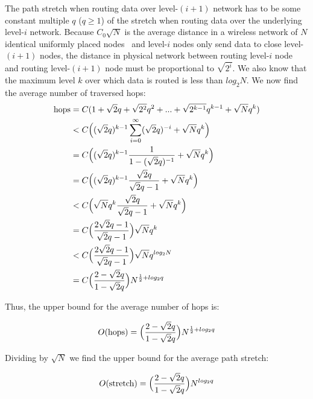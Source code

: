 \documentclass[conference]{IEEEtran}
\theoremstyle{definition}
\begin{document}
The path stretch when routing data over level-$(i+1)$ network has to be some constant multiple $q$ ($q \ge 1$) of the stretch when routing data over the underlying level-$i$ network. Because $C_0\sqrt{N}$ is the average distance in a wireless network of $N$ identical uniformly placed nodes~\cite{Kleinrock} and level-$i$ nodes only send data to close level-$(i+1)$ nodes, the distance in physical network between routing level-$i$ node and routing level-$(i+1)$ node must be proportional to $\sqrt{2^i}$. We also know that the maximum level $k$ over which data is routed is less than $log_2N$. We now find the average number of traversed hops:
\begin{equation*}
\begin{split}
    {\rm hops} & = C (1 + \sqrt{2} q + \sqrt{2^2} q^2  + ... + \sqrt{2^{k-1}} q^{k-1} + \sqrt{N} q^k) \\
               & < C \Big( (\sqrt{2} q)^{k-1} \sum_{i = 0}^{\infty} (\sqrt{2}q)^{-i} + \sqrt{N} q^k \Big) \\
               & = C \Big( (\sqrt{2} q)^{k-1} \frac{1}{1 - (\sqrt{2}q)^{-1}} + \sqrt{N} q^k \Big)  \\
               & = C \Big( (\sqrt{2} q)^{k-1} \frac{\sqrt{2} q}{\sqrt{2}q - 1} + \sqrt{N} q^k \Big)  \\
               & < C \Big( \sqrt{N} q^k \frac{\sqrt{2} q}{\sqrt{2}q - 1} + \sqrt{N} q^k \Big)  \\
               & = C \Big( \frac{2\sqrt{2}q - 1}{\sqrt{2}q - 1} \Big) \sqrt{N} q^k  \\
               & < C \Big( \frac{2\sqrt{2}q - 1}{\sqrt{2}q - 1} \Big) \sqrt{N} q^{log_2 N}  \\
               & = C \Big( \frac{2 - \sqrt{2}q}{1 - \sqrt{2}q} \Big) N^{\frac{1}{2} + log_2 q}
\end{split}
\end{equation*}

Thus, the upper bound for the average number of hops is:

\begin{equation*}
    O({\rm hops}) = \Big( \frac{2 - \sqrt{2}q}{1 - \sqrt{2}q} \Big) N^{\frac{1}{2} + log_2 q}
\end{equation*}

Dividing by $\sqrt{N}$ we find the upper bound for the average path stretch:

\begin{equation*}
    O({\rm stretch}) = \Big( \frac{2 - \sqrt{2}q}{1 - \sqrt{2}q} \Big) N^{log_2 q}
\end{equation*}
\end{document}
